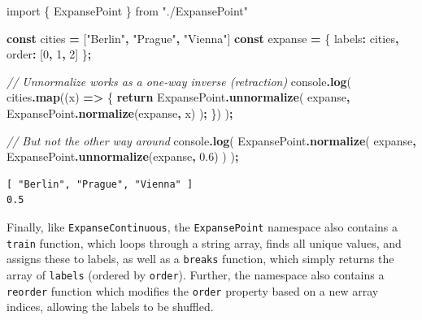 \documentclass[
  openany]{book}
\newenvironment{Shaded}{\begin{snugshade}}{\end{snugshade}}
\newcommand{\BuiltInTok}[1]{#1}
\newcommand{\CommentTok}[1]{\textcolor[rgb]{0.56,0.35,0.01}{\textit{#1}}}
\newcommand{\ControlFlowTok}[1]{\textcolor[rgb]{0.13,0.29,0.53}{\textbf{#1}}}
\newcommand{\DecValTok}[1]{\textcolor[rgb]{0.00,0.00,0.81}{#1}}
\newcommand{\FloatTok}[1]{\textcolor[rgb]{0.00,0.00,0.81}{#1}}
\newcommand{\FunctionTok}[1]{\textcolor[rgb]{0.13,0.29,0.53}{\textbf{#1}}}
\newcommand{\ImportTok}[1]{#1}
\newcommand{\KeywordTok}[1]{\textcolor[rgb]{0.13,0.29,0.53}{\textbf{#1}}}
\newcommand{\NormalTok}[1]{#1}
\newcommand{\OperatorTok}[1]{\textcolor[rgb]{0.81,0.36,0.00}{\textbf{#1}}}
\newcommand{\StringTok}[1]{\textcolor[rgb]{0.31,0.60,0.02}{#1}}
\theoremstyle{definition}
\theoremstyle{definition}
\theoremstyle{definition}
\theoremstyle{definition}
\theoremstyle{remark}
\begin{document}
\begin{Shaded}
\begin{Highlighting}[]
\ImportTok{import}\NormalTok{ \{ ExpansePoint \} }\ImportTok{from} \StringTok{"./ExpansePoint"}

\KeywordTok{const}\NormalTok{ cities }\OperatorTok{=}\NormalTok{ [}\StringTok{"Berlin"}\OperatorTok{,} \StringTok{"Prague"}\OperatorTok{,} \StringTok{"Vienna"}\NormalTok{]}
\KeywordTok{const}\NormalTok{ expanse }\OperatorTok{=}\NormalTok{ \{ labels}\OperatorTok{:}\NormalTok{ cities}\OperatorTok{,}\NormalTok{ order}\OperatorTok{:}\NormalTok{ [}\DecValTok{0}\OperatorTok{,} \DecValTok{1}\OperatorTok{,} \DecValTok{2}\NormalTok{] \}}\OperatorTok{;}

\CommentTok{// Unnormalize works as a one{-}way inverse (retraction)}
\BuiltInTok{console}\OperatorTok{.}\FunctionTok{log}\NormalTok{(}
\NormalTok{  cities}\OperatorTok{.}\FunctionTok{map}\NormalTok{((x) }\KeywordTok{=\textgreater{}}\NormalTok{ \{}
    \ControlFlowTok{return}\NormalTok{ ExpansePoint}\OperatorTok{.}\FunctionTok{unnormalize}\NormalTok{(}
\NormalTok{      expanse}\OperatorTok{,}
\NormalTok{      ExpansePoint}\OperatorTok{.}\FunctionTok{normalize}\NormalTok{(expanse}\OperatorTok{,}\NormalTok{ x)}
\NormalTok{    )}\OperatorTok{;}
\NormalTok{  \})}
\NormalTok{)}\OperatorTok{;}

\CommentTok{// But not the other way around}
\BuiltInTok{console}\OperatorTok{.}\FunctionTok{log}\NormalTok{(}
\NormalTok{  ExpansePoint}\OperatorTok{.}\FunctionTok{normalize}\NormalTok{(}
\NormalTok{    expanse}\OperatorTok{,}\NormalTok{ ExpansePoint}\OperatorTok{.}\FunctionTok{unnormalize}\NormalTok{(expanse}\OperatorTok{,} \FloatTok{0.6}\NormalTok{)}
\NormalTok{  )}
\NormalTok{)}\OperatorTok{;}
\end{Highlighting}
\end{Shaded}

\begin{verbatim}
[ "Berlin", "Prague", "Vienna" ]
0.5
\end{verbatim}

Finally, like \texttt{ExpanseContinuous}, the \texttt{ExpansePoint} namespace also contains a \texttt{train} function, which loops through a string array, finds all unique values, and assigns these to labels, as well as a \texttt{breaks} function, which simply returns the array of \texttt{labels} (ordered by \texttt{order}). Further, the namespace also contains a \texttt{reorder} function which modifies the \texttt{order} property based on a new array indices, allowing the labels to be shuffled.
\end{document}
